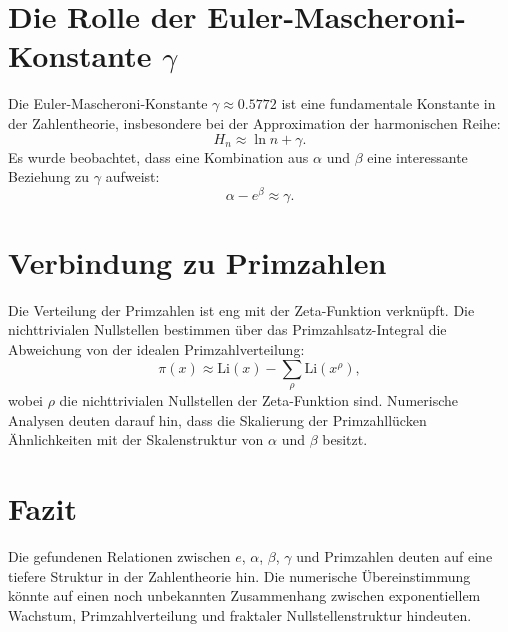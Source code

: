 \documentclass[a4paper,12pt]{article}
\begin{document}
\section{Die Rolle der Euler-Mascheroni-Konstante \( \gamma \)}
Die Euler-Mascheroni-Konstante \( \gamma \approx 0.5772 \) ist eine fundamentale Konstante in der Zahlentheorie, insbesondere bei der Approximation der harmonischen Reihe:
\begin{equation}
    H_n \approx \ln n + \gamma.
\end{equation}
Es wurde beobachtet, dass eine Kombination aus \( \alpha \) und \( \beta \) eine interessante Beziehung zu \( \gamma \) aufweist:
\begin{equation}
    \alpha - e^\beta \approx \gamma.
\end{equation}

\section{Verbindung zu Primzahlen}
Die Verteilung der Primzahlen ist eng mit der Zeta-Funktion verknüpft. Die nichttrivialen Nullstellen bestimmen über das Primzahlsatz-Integral die Abweichung von der idealen Primzahlverteilung:
\begin{equation}
    \pi(x) \approx \text{Li}(x) - \sum_{\rho} \text{Li}(x^\rho),
\end{equation}
wobei \( \rho \) die nichttrivialen Nullstellen der Zeta-Funktion sind. Numerische Analysen deuten darauf hin, dass die Skalierung der Primzahllücken Ähnlichkeiten mit der Skalenstruktur von \( \alpha \) und \( \beta \) besitzt.

\section{Fazit}
Die gefundenen Relationen zwischen \( e \), \( \alpha \), \( \beta \), \( \gamma \) und Primzahlen deuten auf eine tiefere Struktur in der Zahlentheorie hin. Die numerische Übereinstimmung könnte auf einen noch unbekannten Zusammenhang zwischen exponentiellem Wachstum, Primzahlverteilung und fraktaler Nullstellenstruktur hindeuten.
\end{document}
